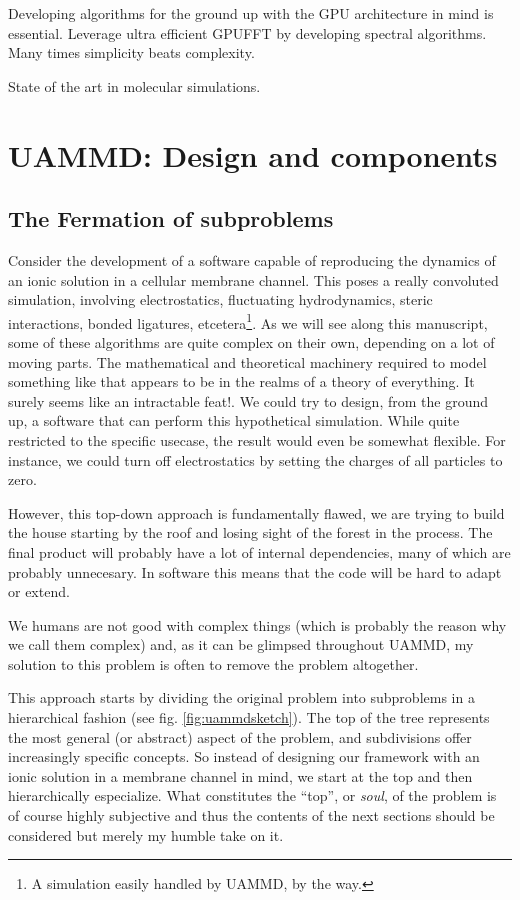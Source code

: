 \documentclass[ twoside,openright,titlepage,numbers=noenddot,%
headinclude,footinclude,cleardoublepage=empty,abstract=on,
BCOR=5mm,paper=a4,fontsize=11pt, dvipsnames
]{scrreprt}
\newcommand{\uammd}{\gls{UAMMD}\xspace}
\newcommand{\gpu}{\gls{GPU}\xspace}
\begin{document}
Developing algorithms for the ground up with the GPU architecture in mind is essential. Leverage ultra efficient \gpu \gls{FFT} by developing spectral algorithms. Many times simplicity beats complexity.

State of the art in molecular simulations.

\cleardoublepage
{}
\part{UAMMD: Design and components}\label{pt:uammd}

\chapter{The Fermation of subproblems}
Consider the development of a software capable of reproducing the dynamics of an ionic solution in a cellular membrane channel. This poses a really convoluted simulation, involving electrostatics, fluctuating hydrodynamics, steric interactions, bonded ligatures, etcetera\footnote{A simulation easily handled by \uammd, by the way.}. As we will see along this manuscript, some of these algorithms are quite complex on their own, depending on a lot of moving parts. The mathematical and theoretical machinery required to model something like that appears to be in the realms of a theory of everything. It surely seems like an intractable feat!.
We could try to design, from the ground up, a software that can perform this hypothetical simulation. While quite restricted to the specific usecase, the result would even be somewhat flexible. For instance, we could turn off electrostatics by setting the charges of all particles to zero.

However, this top-down approach is fundamentally flawed, we are trying to build the house starting by the roof and losing sight of the forest in the process. The final product will probably have a lot of internal dependencies, many of which are probably unnecesary. In software this means that the code will be hard to adapt or extend.

We humans are not good with complex things (which is probably the reason why we call them complex) and, as it can be glimpsed throughout \uammd, my solution to this problem is often to remove the problem altogether.

This approach starts by dividing the original problem into subproblems in a hierarchical fashion (see fig. \ref{fig:uammdsketch}). The top of the tree represents the most general (or abstract) aspect of the problem, and subdivisions offer increasingly specific concepts. So instead of designing our framework with an ionic solution in a membrane channel in mind, we start at the top and then hierarchically especialize. What constitutes the ``top'', or \emph{soul}, of the problem is of course highly subjective and thus the contents of the next sections should be considered but merely my humble take on it.
\end{document}
